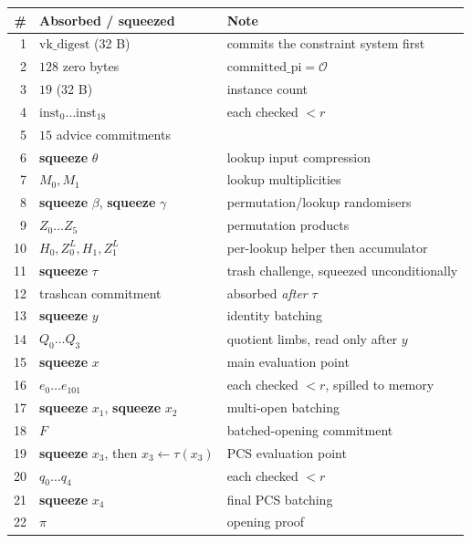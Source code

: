 \documentclass[11pt,a4paper]{article}
\newcommand{\Ident}{\ensuremath{\mathcal{O}}}
\newcommand{\trunc}{\ensuremath{\tau}}
\theoremstyle{definition}
\begin{document}
\begin{center}
\begin{tabular}{@{}rlp{7.4cm}@{}}
\toprule
\# & Absorbed / squeezed & Note \\
\midrule
1 & $\mathrm{vk\_digest}$ (32 B)             & commits the constraint system first \\
2 & $128$ zero bytes                          & $\mathrm{committed\_pi}=\Ident$ \\
3 & $19$ (32 B)                               & instance count \\
4 & $\mathrm{inst}_0 \ldots \mathrm{inst}_{18}$ & each checked $< r$ \\
5 & $15$ advice commitments                   & \\
6 & \textbf{squeeze} $\theta$                 & lookup input compression \\
7 & $M_0, M_1$                                & lookup multiplicities \\
8 & \textbf{squeeze} $\beta$, \textbf{squeeze} $\gamma$ & permutation/lookup randomisers \\
9 & $Z_0 \ldots Z_5$                          & permutation products \\
10 & $H_0, Z^{L}_0, H_1, Z^{L}_1$             & per-lookup helper then accumulator \\
11 & \textbf{squeeze} $\tau$                  & trash challenge, squeezed unconditionally \\
12 & trashcan commitment                       & absorbed \emph{after} $\tau$ \\
13 & \textbf{squeeze} $y$                     & identity batching \\
14 & $Q_0 \ldots Q_3$                         & quotient limbs, read only after $y$ \\
15 & \textbf{squeeze} $x$                     & main evaluation point \\
16 & $e_0 \ldots e_{101}$                     & each checked $< r$, spilled to memory \\
17 & \textbf{squeeze} $x_1$, \textbf{squeeze} $x_2$ & multi-open batching \\
18 & $F$                                       & batched-opening commitment \\
19 & \textbf{squeeze} $x_3$, then $x_3 \leftarrow \trunc(x_3)$ & PCS evaluation point \\
20 & $q_0 \ldots q_4$                          & each checked $< r$ \\
21 & \textbf{squeeze} $x_4$                    & final PCS batching \\
22 & $\pi$                                     & opening proof \\
\bottomrule
\end{tabular}
\end{center}
\end{document}
